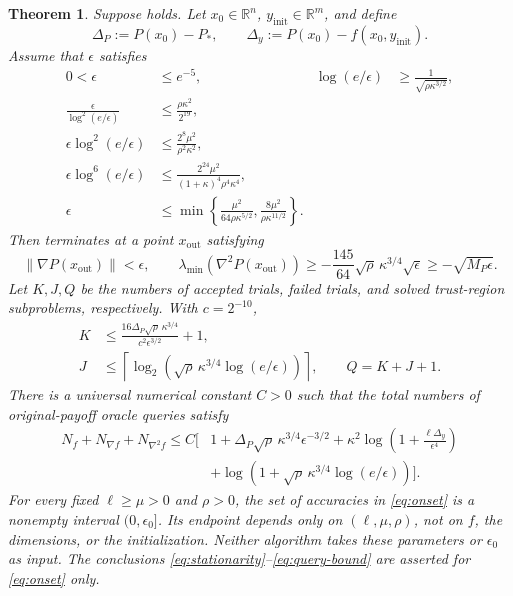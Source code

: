 \documentclass[11pt]{article}
\numberwithin{equation}{section}
\newtheorem{theorem}[assumption]{Theorem}
\newcommand{\R}{\mathbb R}
\newcommand{\eps}{\epsilon}
\newcommand{\norm}[1]{\left\lVert#1\right\rVert}
\newcommand{\MP}{M_P}
\begin{document}
\begin{theorem}\label{thm:main}
Suppose  holds. Let
$x_0\in\R^n$, $y_{\mathrm{init}}\in\R^m$, and define
\[
 \Delta_P:=P(x_0)-P_*,\qquad
 \Delta_y:=P(x_0)-f(x_0,y_{\mathrm{init}}).
\]
Assume that $\eps$ satisfies
\begin{subequations}\label{eq:onset}
\begin{align}
 0<\eps&\le e^{-5},
 &\log(e/\eps)&\ge\frac1{\sqrt{\rho\kappa^{3/2}}},\label{eq:onset-scale}\\
 \frac{\eps}{\log^2(e/\eps)}
 &\le\frac{\rho\kappa^2}{2^{19}},\label{eq:onset-init}\\
 \eps\log^2(e/\eps)
 &\le\frac{2^8\mu^2}{\rho^2\kappa^2},\label{eq:onset-radius}\\
 \eps\log^6(e/\eps)
 &\le\frac{2^{24}\mu^2}
              {(1+\kappa)^4\rho^4\kappa^4},\label{eq:onset-hessian}\\
 \eps&\le\min\left\{
       \frac{\mu^2}{64\rho\kappa^{5/2}},
       \frac{8\mu^2}{\rho\kappa^{11/2}}
                         \right\}.\label{eq:onset-polish}
\end{align}
\end{subequations}
Then  terminates at a point $x_{\mathrm{out}}$ satisfying
\begin{equation}\label{eq:stationarity}
 \norm{\nabla P(x_{\mathrm{out}})}<\eps,
 \qquad
 \lambda_{\min}(\nabla^2P(x_{\mathrm{out}}))
 \ge-\frac{145}{64}\sqrt\rho\,\kappa^{3/4}\sqrt\eps
 \ge-\sqrt{\MP\eps}.
\end{equation}
Let $K,J,Q$ be the numbers of accepted trials, failed trials, and
solved trust-region subproblems, respectively. With $c=2^{-10}$,
\begin{align}
 K&\le\frac{16\Delta_P\sqrt\rho\,\kappa^{3/4}}
                 {c^2\eps^{3/2}}+1,\label{eq:K-bound}\\
 J&\le\left\lceil\log_2\left(
             \sqrt\rho\,\kappa^{3/4}\log(e/\eps)\right)\right\rceil,
 \qquad Q=K+J+1.\label{eq:J-bound}
\end{align}
There is a universal numerical constant $C>0$ such that the total
numbers of original-payoff oracle queries satisfy
\begin{equation}\label{eq:query-bound}
\begin{split}
 N_f+N_{\nabla f}+N_{\nabla^2 f}\le C\Bigg[
 &1+\Delta_P\sqrt\rho\,\kappa^{3/4}\eps^{-3/2}
   +\kappa^2\log\left(1+\frac{\ell\Delta_y}{\eps^4}\right)\\
 &+\log\left(1+
          \sqrt\rho\,\kappa^{3/4}\log(e/\eps)\right)\Bigg].
\end{split}
\end{equation}
For every fixed $\ell\ge\mu>0$ and $\rho>0$, the set of accuracies
in \eqref{eq:onset} is a nonempty interval $(0,\eps_0]$.
Its endpoint depends only on $(\ell,\mu,\rho)$, not on $f$, the
dimensions, or the initialization. Neither algorithm takes these
parameters or $\eps_0$ as input. The conclusions
\eqref{eq:stationarity}--\eqref{eq:query-bound} are asserted for
\eqref{eq:onset} only.
\end{theorem}
\end{document}
